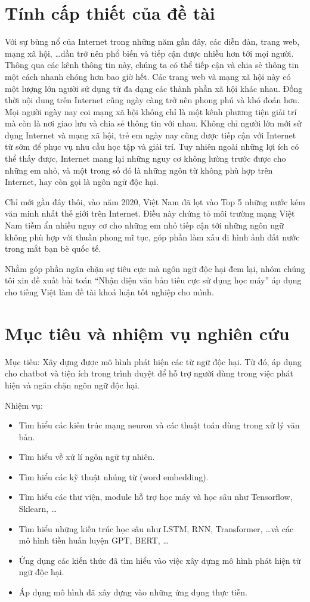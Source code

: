 \section{Tính cấp thiết của đề tài}
Với sự bùng nổ của Internet trong những năm gần đây, các diễn đàn, trang web, mạng xã hội, \dots dần trở nên phổ biến và tiếp cận được nhiều hơn tới mọi người. Thông qua các kênh thông tin này, chúng ta có thể tiếp cận và chia sẻ thông tin một cách nhanh chóng hơn bao giờ hết. Các trang web và mạng xã hội này có một lượng lớn người sử dụng từ đa dạng các thành phần xã hội khác nhau. Đồng thời nội dung trên Internet cũng ngày càng trở nên phong phú và khó đoán hơn. Mọi người ngày nay coi mạng xã hội không chỉ là một kênh phương tiện giải trí mà còn là nơi giao lưu và chia sẻ thông tin với nhau. Không chỉ người lớn mới sử dụng Internet và mạng xã hội, trẻ em ngày nay cũng được tiếp cận với Internet từ sớm để phục vụ nhu cầu học tập và giải trí. Tuy nhiên ngoài những lợi ích có thể thấy được, Internet mang lại những nguy cơ không lường trước được cho những em nhỏ, và một trong số đó là những ngôn từ không phù hợp trên Internet, hay còn gọi là ngôn ngữ độc hại.

Chỉ mới gần đây thôi, vào năm 2020, Việt Nam đã lọt vào Top 5 những nước kém văn minh nhất thế giới trên Internet\cite{webpage28}. Điều này chứng tỏ môi trường mạng Việt Nam tiềm ẩn nhiều nguy cơ cho những em nhỏ tiếp cận tới những ngôn ngữ không phù hợp với thuần phong mĩ tục, góp phần làm xấu đi hình ảnh đất nước trong mắt bạn bè quốc tế.

Nhằm góp phần ngăn chặn sự tiêu cực mà ngôn ngữ độc hại đem lại, nhóm chúng tôi xin đề xuất bài toán ``Nhận diện văn bản tiêu cực sử dụng học máy'' áp dụng cho tiếng Việt làm đề tài khoá luận tốt nghiệp cho mình.

\section{Mục tiêu và nhiệm vụ nghiên cứu}
Mục tiêu: Xây dựng được mô hình phát hiện các từ ngữ độc hại. Từ đó, áp dụng cho chatbot và tiện ích trong trình duyệt để hỗ trợ người dùng trong việc phát hiện và ngăn chặn ngôn ngữ độc hại.

Nhiệm vụ:
\begin{itemize}
    \item Tìm hiểu các kiến trúc mạng neuron và các thuật toán dùng trong xử lý văn bản.
    \item Tìm hiểu về xử lí ngôn ngữ tự nhiên.
    \item Tìm hiểu các kỹ thuật nhúng từ (word embedding).
    \item Tìm hiểu các thư viện, module hỗ trợ học máy và học sâu như Tensorflow, Sklearn, \dots
    \item Tìm hiểu những kiến trúc học sâu như LSTM, RNN, Transformer, \dots và các mô hình tiền huấn luyện GPT, BERT, \dots
    \item Ứng dụng các kiến thức đã tìm hiểu vào việc xây dựng mô hình phát hiện từ ngữ độc hại.
    \item Áp dụng mô hình đã xây dựng vào những ứng dụng thực tiễn.
\end{itemize}

